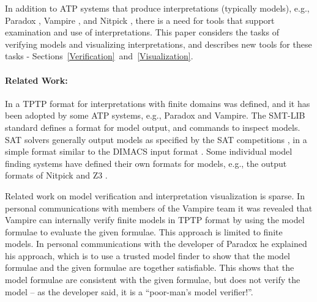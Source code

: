 \documentclass{easychair}
\begin{document}
In addition to ATP systems that produce interpretations (typically models),
e.g., Paradox \cite{CS03}, Vampire \cite{KV13}, and Nitpick \cite{BN10-ITP},
there is a need for tools that support examination and use of interpretations.
This paper considers the tasks of verifying models and visualizing interpretations, and describes 
new tools for these tasks - Sections~\ref{Verification}~and~\ref{Visualization}.

\paragraph{Related Work:}
In \cite{SS+06} a TPTP format for interpretations with finite domains was defined, and it has been 
adopted by some ATP systems, e.g., Paradox and Vampire.
The SMT-LIB standard \cite{BFT17} defines a format for model output, and commands to inspect 
models.  
SAT solvers generally output models as specified by the SAT competitions \cite{JL+12}, in a 
simple format similar to the DIMACS input format \cite{Bab93}.
Some individual model finding systems have defined their own formats for models, e.g., the 
output formats of Nitpick and Z3 \cite{dMB08}.

Related work on model verification and interpretation visualization is sparse.
In personal communications with members of the Vampire team it was revealed that Vampire can 
internally verify finite models in TPTP format by using the model formulae to evaluate the given 
formulae.
This approach is limited to finite models.
In personal communications with the developer of Paradox he explained his approach, which is to 
use a trusted model finder to show that the model formulae and the given formulae are together 
satisfiable.
This shows that the model formulae are consistent with the given formulae, but does not verify 
the model -- as the developer said, it is a ``poor-man's model verifier!''.
\end{document}
